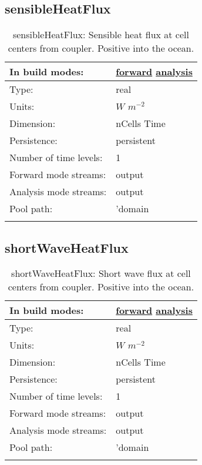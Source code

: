 \subsection[sensibleHeatFlux]{sensibleHeatFlux}
\label{subsec:var_sec_forcing_sensibleHeatFlux}
\begin{center}
\begin{longtable}{| p{2.0in} | p{4.0in} |}
        \hline 
        In build modes: & \hyperref[subsec:forward_var_tab_forcing]{forward} \hyperref[subsec:analysis_var_tab_forcing]{analysis} \\
        \hline 
        Type: & real \\
        \hline 
        Units: & $W$ $m^{-2}$ \\
        \hline 
        Dimension: & nCells Time \\
        \hline 
        Persistence: & persistent \\
        \hline 
        Number of time levels: & 1 \\
        \hline 
		 Forward mode streams: &  output \\
        \hline 
		 Analysis mode streams: &  output \\
        \hline 
            Pool path: & 'domain %
 \\
		 \hline 
    \caption{sensibleHeatFlux: Sensible heat flux at cell centers from coupler. Positive into the ocean.}
\end{longtable}
\end{center}
\subsection[shortWaveHeatFlux]{shortWaveHeatFlux}
\label{subsec:var_sec_forcing_shortWaveHeatFlux}
\begin{center}
\begin{longtable}{| p{2.0in} | p{4.0in} |}
        \hline 
        In build modes: & \hyperref[subsec:forward_var_tab_forcing]{forward} \hyperref[subsec:analysis_var_tab_forcing]{analysis} \\
        \hline 
        Type: & real \\
        \hline 
        Units: & $W$ $m^{-2}$ \\
        \hline 
        Dimension: & nCells Time \\
        \hline 
        Persistence: & persistent \\
        \hline 
        Number of time levels: & 1 \\
        \hline 
		 Forward mode streams: &  output \\
        \hline 
		 Analysis mode streams: &  output \\
        \hline 
            Pool path: & 'domain %
 \\
		 \hline 
    \caption{shortWaveHeatFlux: Short wave flux at cell centers from coupler. Positive into the ocean.}
\end{longtable}
\end{center}
